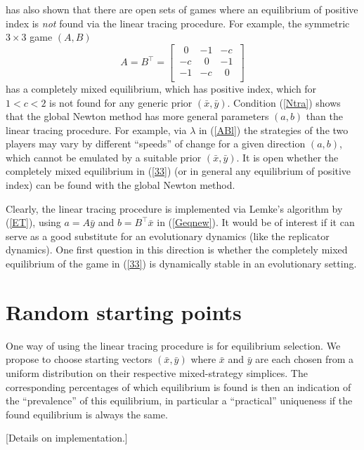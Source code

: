 \documentclass[a4paper,12pt]{article}  %
\theoremstyle{definition}
\newcommand{\T}{^{\top}}
\newcommand{\0}{{\mathbf0}}
\newcommand{\1}{{\mathbf1}}
\begin{document}
\citet{balthasar2010} has also shown that there are open
sets of games where an equilibrium of positive index is
\textit{not} found via the linear tracing procedure.
For example, the symmetric $3\times 3$ game $(A,B)$
\begin{equation}
\label{33}
A=B\T=\left[\,\begin{matrix}
~~0 & -1 & -c\\
-c & ~~0 & -1\\
-1 & -c & ~~0\\
\end{matrix}\,\right] 
\end{equation}
has a completely mixed equilibrium, which has positive
index, which for $1<c<2$ is not found for any generic prior
$(\bar x,\bar y)$.
Condition (\ref{Ntra}) shows that the global Newton method
has more general parameters $(a,b)$ than the linear tracing
procedure.
For example, via $\lambda$ in (\ref{ABl}) the strategies of
the two players may vary by different ``speeds'' of change
for a given direction $(a,b)$, which cannot be emulated by a
suitable prior $(\bar x,\bar y)$.
It is open whether the completely mixed equilibrium in
(\ref{33}) (or in general any equilibrium of positive index)
can be found with the global Newton method.

Clearly, the linear tracing procedure is implemented via 
Lemke's algorithm by (\ref{ET}), using $a=A\bar y$ and
$b=B\T\bar x$ in (\ref{Geqnew}).
It would be of interest if it can serve as a good substitute
for an evolutionary dynamics (like the replicator dynamics).
One first question in this direction is whether the
completely mixed equilibrium of the game in (\ref{33}) is
dynamically stable in an evolutionary setting.

\section{Random starting points}

One way of using the linear tracing procedure is for
equilibrium selection.
We propose to choose starting vectors $(\bar x,\bar y)$
where $\bar x$ and $\bar y$ are each chosen from a uniform
distribution on their respective mixed-strategy simplices.
The corresponding percentages of which equilibrium is found
is then an indication of the ``prevalence'' of this
equilibrium, in particular a ``practical'' uniqueness if
the found equilibrium is always the same.

[Details on implementation.]


\small

 
\end{document}

